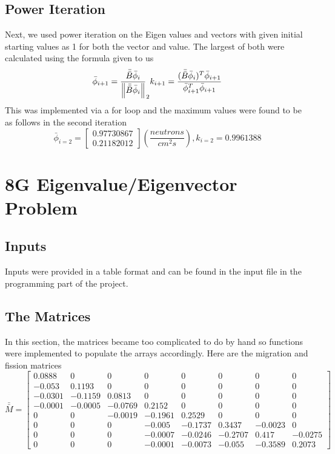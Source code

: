 \documentclass[11pt, oneside]{article}   	%
\begin{document}
\subsection{Power Iteration}
Next, we used power iteration on the Eigen values and vectors with given initial starting values as 1 for both the vector and value. The largest of both were calculated using the formula given to us
\begin{equation}\bar{\phi }_{i+1} = \frac{\bar{\bar{B}}\bar{\phi }_{i}}{\left \| \bar{\bar{B}}\bar{\phi }_{i} \right \|}_{2}\\
k_{i+1} = \frac{(\bar{\bar{B}}\bar{\phi }_{i})^{T}\bar{\phi }_{i+1}}{\bar{\phi }_{i+1}^{T}\bar{\phi }_{i+1}}\end{equation}
This was implemented via a for loop and the maximum values were found to be as follows in the second iteration
$$\bar{\phi} _{i=2} = \begin{bmatrix}
0.97730867\\ 
0.21182012
\end{bmatrix}(\frac{neutrons}{cm^{2}s}), k_{i=2} = 0.9961388
$$
\newpage
\section{8G Eigenvalue/Eigenvector Problem}
\subsection{Inputs}
Inputs were provided in a table format and can be found in the input file in the programming part of the project. 
\subsection{The Matrices}

In this section, the matrices became too complicated to do by hand so functions were implemented to populate the arrays accordingly. Here are the migration and fission matrices
$$\bar{\bar{M}} = \begin{bmatrix}
0.0888 & 0 & 0 & 0 & 0 & 0 & 0 &0 \\ 
 -0.053& 0.1193 &0  & 0 & 0 & 0 & 0 &0 \\ 
 -0.0301 &-0.1159 & 0.0813    & 0 &0  &0  &0  &0 \\ 
 -0.0001& -0.0005 & -0.0769 & 0.2152 & 0 & 0 & 0 & 0\\ 
 0     & 0     &-0.0019 &-0.1961  &0.2529 & 0    &  0     & 0  \\ 
 0    & 0    & 0    &-0.005  &-0.1737  &0.3437 &-0.0023 & 0    \\ 
 0     &0     & 0     &-0.0007 &-0.0246 &-0.2707 & 0.417 & -0.0275\\ 
 0&0  & 0 & -0.0001 & -0.0073 & -0.055 & -0.3589 & 0.2073
\end{bmatrix}$$
\end{document}
